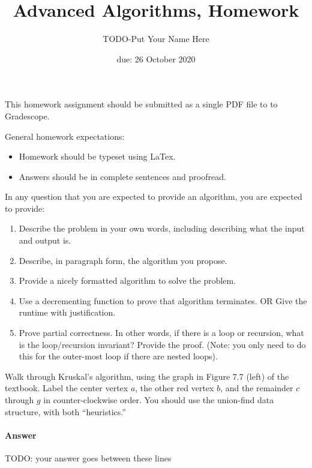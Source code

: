 \documentclass{article}
\title{Advanced Algorithms, Homework \hwnum}
\author{TODO-Put Your Name Here}
\date{due: 26 October 2020}
\begin{document}
\maketitle

This homework assignment should be
submitted as a single PDF file to to Gradescope.

General homework expectations:
\begin{itemize}
    \item Homework should be typeset using LaTex.
    \item Answers should be in complete sentences and proofread.
\end{itemize}

In any question that you are expected to provide an algorithm, you are
expected to provide:
\begin{enumerate}
    \item Describe the problem in your own words, including
        describing what the input and output is.
    \item Describe, in paragraph form, the algorithm you propose.
    \item Provide a nicely formatted algorithm to solve the problem.
    \item Use a decrementing function to prove that algorithm terminates.
            OR  Give the runtime with justification.
    \item Prove partial correctness.  In other words, if there is a loop or
        recursion, what is the loop/recursion invariant? Provide the proof.
        (Note: you only need to do this for the outer-most loop if there are
        nested loops).
\end{enumerate}



\nextprob
{}

Walk through Kruskal's algorithm, using the graph in Figure 7.7 (left) of the
textbook.  Label the center vertex $a$, the other red vertex $b$, and the
remainder $c$ through $g$ in counter-clockwise order.  You should use the
union-find data structure, with both ``heuristics.''

\paragraph{Answer}


TODO: your answer goes between these lines
\end{document}
